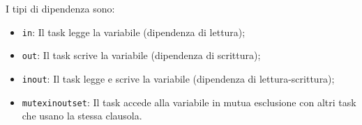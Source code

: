I tipi di dipendenza sono:
\begin{itemize}
    \item \texttt{in}: Il task legge la variabile (dipendenza di lettura);
    \item \texttt{out}: Il task scrive la variabile (dipendenza di scrittura);
    \item \texttt{inout}: Il task legge e scrive la variabile (dipendenza di lettura-scrittura);
    \item \texttt{mutexinoutset}: Il task accede alla variabile in mutua esclusione con altri task che usano la stessa clausola.
\end{itemize}

